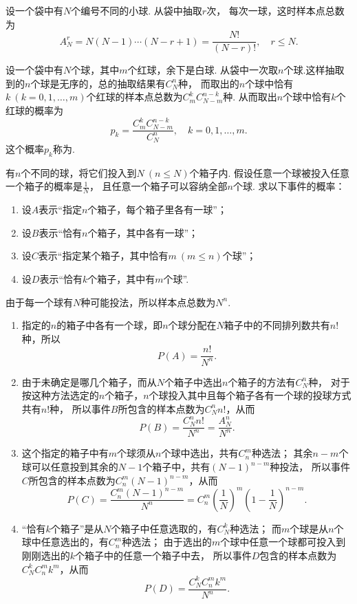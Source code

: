 \begin{example}
设一个袋中有\(N\)个编号不同的小球.
从袋中抽取\(r\)次，
每次一球，这时样本点总数为\[
A_N^r = N(N-1)\dotsb(N-r+1) = \frac{N!}{(N-r)!},
\quad
r \leq N.
\]
\end{example}

\begin{example}
设一个袋中有\(N\)个球，其中\(m\)个红球，余下是白球.
从袋中一次取\(n\)个球.这样抽取到的\(n\)个球是无序的，总的抽取结果有\(C_N^n\)种，
而取出的\(n\)个球中恰有\(k\ (k=0,1,\dotsc,m)\)个红球的样本点总数为\(C_m^k C_{N-m}^{n-k}\)种.
从而取出\(n\)个球中恰有\(k\)个红球的概率为\[
p_k = \frac{C_m^k C_{N-m}^{n-k}}{C_N^n},
\quad k=0,1,\dotsc,m.
\]
这个概率\(p_k\)称为.
\end{example}

\begin{example}[投球问题]\label{example:概率论基础.古典概型.投球问题}
有\(n\)个不同的球，将它们投入到\(N\ (n \leq N)\)个箱子内.
假设任意一个球被投入任意一个箱子的概率是\(\frac{1}{N}\)，
且任意一个箱子可以容纳全部\(n\)个球.
求以下事件的概率：
\begin{enumerate}
	\item 设\(A\)表示“指定\(n\)个箱子，每个箱子里各有一球”；
	\item 设\(B\)表示“恰有\(n\)个箱子，其中各有一球”；
	\item 设\(C\)表示“指定某个箱子，其中恰有\(m\ (m \leq n)\)个球”；
	\item 设\(D\)表示“恰有\(k\)个箱子，其中有\(m\)个球”.
\end{enumerate}
\begin{solution}
由于每一个球有\(N\)种可能投法，所以样本点总数为\(N^n\).
\begin{enumerate}
\item
指定的\(n\)的箱子中各有一个球，即\(n\)个球分配在\(N\)箱子中的不同排列数共有\(n!\)种，所以\[
P(A) = \frac{n!}{N^n}.
\]

\item
由于未确定是哪几个箱子，而从\(N\)个箱子中选出\(n\)个箱子的方法有\(C_N^n\)种，
对于按这种方法选定的\(n\)个箱子，\(n\)个球投入其中且每个箱子各有一个球的投球方式共有\(n!\)种，
所以事件\(B\)所包含的样本点数为\(C_N^n n!\)，从而\[
P(B) = \frac{C_N^n n!}{N^n} = \frac{A_N^n}{N^n}.
\]

\item
这个指定的箱子中有\(m\)个球须从\(n\)个球中选出，共有\(C_n^m\)种选法；
其余\(n-m\)个球可以任意投到其余的\(N-1\)个箱子中，共有\((N-1)^{n-m}\)种投法，
所以事件\(C\)所包含的样本点数为\(C_n^m (N-1)^{n-m}\)，从而\[
	P(C) = \frac{C_n^m (N-1)^{n-m}}{N^n}
	= C_n^m \left(\frac{1}{N}\right)^m \left(1-\frac{1}{N}\right)^{n-m}.
\]

\item
“恰有\(k\)个箱子”是从\(N\)个箱子中任意选取的，有\(C_N^k\)种选法；
而\(m\)个球是从\(n\)个球中任意选出的，有\(C_n^m\)种选法；
由于选出的\(m\)个球中任意一个球都可投入到刚刚选出的\(k\)个箱子中的任意一个箱子中去，
所以事件\(D\)包含的样本点数为\(C_N^k C_n^m k^m\)，从而\[
	P(D) = \frac{C_N^k C_n^m k^m}{N^n}.
\]
\end{enumerate}
\end{solution}
\end{example}

